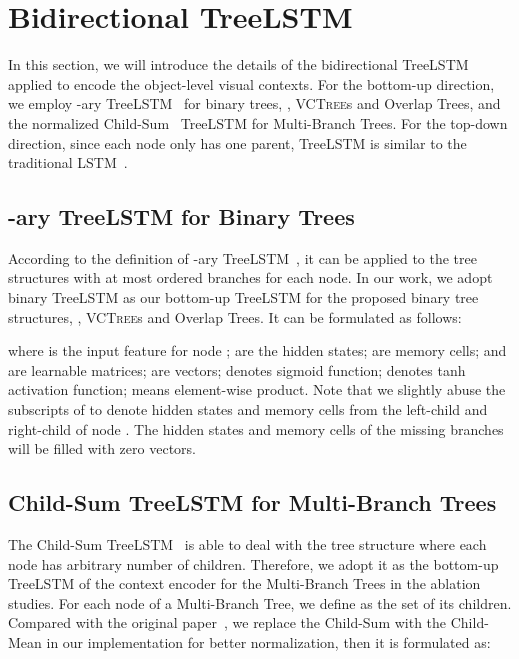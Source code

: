 \documentclass[10pt,twocolumn,letterpaper]{article}
\begin{document}
{\small


}

\newpage

\appendix
\section{Bidirectional TreeLSTM}
In this section, we will introduce the details of the bidirectional TreeLSTM applied to encode the object-level visual contexts. For the bottom-up direction, we employ -ary TreeLSTM~\cite{tai2015improved} for binary trees, \ie, \textsc{VCTree}s and Overlap Trees, and the normalized Child-Sum~\cite{tai2015improved} TreeLSTM for Multi-Branch Trees. For the top-down direction, since each node only has one parent, TreeLSTM is similar to the traditional LSTM~\cite{hochreiter1997long}.

\subsection{-ary TreeLSTM for Binary Trees}
According to the definition of -ary TreeLSTM~\cite{tai2015improved}, it can be applied to the tree structures with at most  ordered branches for each node. In our work, we adopt binary TreeLSTM as our bottom-up TreeLSTM for the proposed binary tree structures, \ie, \textsc{VCTree}s and Overlap Trees. It can be formulated as follows:

where  is the input feature for node ;  are the hidden states;  are memory cells;  and  are learnable matrices;  are vectors;  denotes sigmoid function;  denotes tanh activation function;  means element-wise product. Note that we slightly abuse the subscripts  of  to denote hidden states and memory cells from the left-child and right-child of node . The hidden states and memory cells of the missing branches will be filled with zero vectors.

\subsection{Child-Sum TreeLSTM for Multi-Branch Trees}
The Child-Sum TreeLSTM~\cite{tai2015improved} is able to deal with the tree structure where each node has arbitrary number of children. Therefore, we adopt it as the bottom-up TreeLSTM of the context encoder for the Multi-Branch Trees in the ablation studies. For each node  of a Multi-Branch Tree, we define  as the set of its children. Compared with the original paper~\cite{tai2015improved}, we replace the Child-Sum with the Child-Mean in our implementation for better normalization, then it is formulated as:
\end{document}
